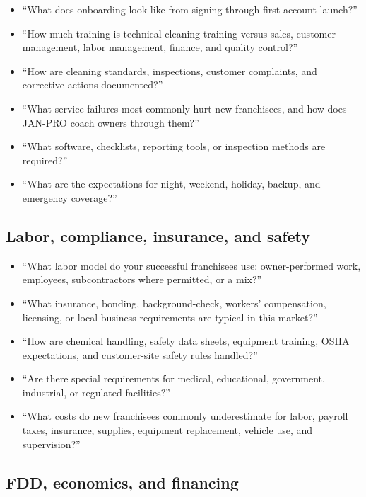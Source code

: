 \documentclass[11pt]{article}
\newcommand{\janpro}{JAN-PRO}
\begin{document}
\begin{itemize}
  \item ``What does onboarding look like from signing through first account launch?''
  \item ``How much training is technical cleaning training versus sales, customer management, labor management, finance, and quality control?''
  \item ``How are cleaning standards, inspections, customer complaints, and corrective actions documented?''
  \item ``What service failures most commonly hurt new franchisees, and how does \janpro{} coach owners through them?''
  \item ``What software, checklists, reporting tools, or inspection methods are required?''
  \item ``What are the expectations for night, weekend, holiday, backup, and emergency coverage?''
\end{itemize}

\subsection{Labor, compliance, insurance, and safety}

\begin{itemize}
  \item ``What labor model do your successful franchisees use: owner-performed work, employees, subcontractors where permitted, or a mix?''
  \item ``What insurance, bonding, background-check, workers' compensation, licensing, or local business requirements are typical in this market?''
  \item ``How are chemical handling, safety data sheets, equipment training, OSHA expectations, and customer-site safety rules handled?''
  \item ``Are there special requirements for medical, educational, government, industrial, or regulated facilities?''
  \item ``What costs do new franchisees commonly underestimate for labor, payroll taxes, insurance, supplies, equipment replacement, vehicle use, and supervision?''
\end{itemize}

\subsection{FDD, economics, and financing}
\end{document}
